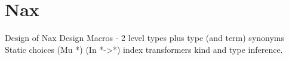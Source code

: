 \section{Nax}\label{sec:Nax}
Design of Nax
    Design Macros - 2 level types plus type (and term) synonyms
    Static choices (Mu *)  (In *->*)   index transformers
    kind and type inference.


